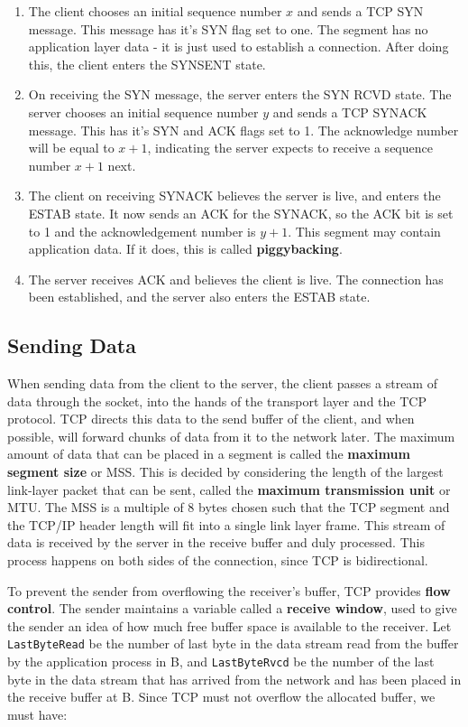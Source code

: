 \documentclass[12pt,letterpaper]{amsbook}
\theoremstyle{definition}
\begin{document}
\begin{enumerate}
  \item The client chooses an initial sequence number $x$ and sends a TCP SYN message. This message has it's SYN flag set to one. The segment has no application layer data - it is just used to establish a connection. After doing this, the client enters the SYNSENT state.
  \item On receiving the SYN message, the server enters the SYN RCVD state. The server chooses an initial sequence number $y$ and sends a TCP SYNACK message. This has it's SYN and ACK flags set to 1. The acknowledge number will be equal to $x+1$, indicating the server expects to receive a sequence number $x+1$ next.
  \item The client on receiving SYNACK believes the server is live, and enters the ESTAB state. It now sends an ACK for the SYNACK, so the ACK bit is set to 1 and the acknowledgement number is $y+1$. This segment may contain application data. If it does, this is called \textbf{piggybacking}.
  \item The server receives ACK and believes the client is live. The connection has been established, and the server also enters the ESTAB state.
\end{enumerate}

\subsection{Sending Data}

When sending data from the client to the server, the client passes a stream of data through the socket, into the hands of the transport layer and the TCP protocol. TCP directs this data to the send buffer of the client, and when possible, will forward chunks of data from it to the network later. The maximum amount of data that can be placed in a segment is called the \textbf{maximum segment size} or MSS. This is decided by considering the length of the largest link-layer packet that can be sent, called the \textbf{maximum transmission unit} or MTU. The MSS is a multiple of 8 bytes chosen such that the TCP segment and the TCP/IP header length will fit into a single link layer frame. This stream of data is received by the server in the receive buffer and duly processed. This process happens on both sides of the connection, since TCP is bidirectional.

To prevent the sender from overflowing the receiver's buffer, TCP provides \textbf{flow control}. The sender maintains a variable called a \textbf{receive window}, used to give the sender an idea of how much free buffer space is available to the receiver. Let \texttt{LastByteRead} be the number of last byte in the data stream read from the buffer by the application process in B, and \texttt{LastByteRvcd} be the number of the last byte in the data stream that has arrived from the network and has been placed in the receive buffer at B. Since TCP must not overflow the allocated buffer, we must have:
\end{document}
